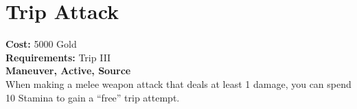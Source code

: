 \section{Trip Attack}
\textbf{Cost:} 5000 Gold\\
\textbf{Requirements:} Trip III\\
\textbf{Maneuver, Active, Source}\\
When making a melee weapon attack that deals at least 1 damage, you can spend 10 Stamina to gain a “free” trip attempt.\\
